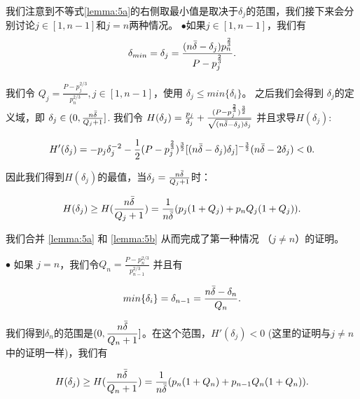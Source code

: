我们注意到不等式\ref{lemma:5a}的右侧取最小值是取决于$\delta_j$的范围，我们接下来会分别讨论$j\in[1,n-1]$和$j=n$两种情况。
\noindent$\bullet$如果$j \in [1,n-1]$，我们有 
\begin{equation}
    \delta_{min}=\delta_j=\frac{(n\Bar{\delta}-\delta_j)p_n^{\frac{2}{3}}}{P-p_j^{\frac{2}{3}}}. \nonumber
\end{equation}

我们令 $Q_j=\frac{P-p_j^{2/3}}{p_n^{2/3}},j\in[1,n-1]$，使用 $\delta_j \leq min\{\delta_i\}$。 之后我们会得到 $\delta_j$的定义域，即 $\delta_j \in (0,\frac{n\Bar{\delta}}{Q_j+1}]$. 我们令 $H(\delta_j)=\frac{p_j}{\delta_j}+\frac{(P-p_j^{\frac{2}{3}})^\frac{3}{2}}{\sqrt{(n\Bar{\delta}-\delta_j)\delta_j}}$ 并且求导$H(\delta_j)$:

\begin{equation}
    H'(\delta_j)=  -p_j \delta_j^{-2}-\frac{1}{2}(P-p_j^{\frac{2}{3}})^{\frac{3}{2}}[(n\Bar{\delta}-\delta_j)\delta_j]^{-\frac{3}{2}}(n\Bar{\delta}-2\delta_j) < 0. \nonumber
\end{equation}

因此我们得到$H(\delta_j)$的最值，当$\delta_j=\frac{n\Bar{\delta}}{Q_j+1}$时：

\begin{equation}
    H(\delta_j)\geq H(\frac{n\Bar{\delta}}{Q_j+1})=\frac{1}{n\Bar{\delta}}(p_j(1+Q_j)+p_n Q_j(1+Q_j)).
\label{lemma:5b}
\end{equation}

我们合并 \ref{lemma:5a} 和 \ref{lemma:5b} 从而完成了第一种情况 （$j\neq n$）的证明。

\noindent$\bullet$ 如果 $j=n$，我们令$Q_n=\frac{P-p_n^{2/3}}{p_{n-1}^{2/3}}$ 并且有

\begin{equation}
    min\{\delta_i\}= \delta_{n-1}=\frac{n\Bar{\delta}-\delta_n}{Q_n}. \nonumber
\end{equation}

我们得到$\delta_n$的范围是$(0,\dfrac{n\Bar{\delta}}{Q_n+1} ]$。在这个范围，$H'(\delta_j)<0$ (这里的证明与$j \neq n$中的证明一样)，我们有 

\begin{equation}
    H(\delta_j)\geq H(\frac{n\Bar{\delta}}{Q_n+1} )=\frac{1}{n\Bar{\delta}}(p_n(1+Q_n)+p_{n-1} Q_n(1+Q_n)).
\label{lemma:5c}
\end{equation}

